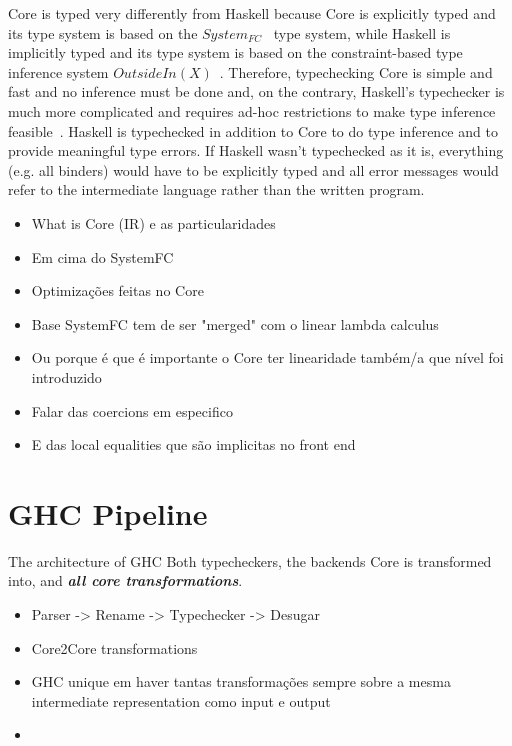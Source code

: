 \documentclass[]{lwnovathesis}
\begin{document}
Core is typed very differently from Haskell because Core is explicitly typed and
its type system is based on the $System_{FC}$~\cite{systemfc} type system, while
Haskell is implicitly typed and its type system is based on the constraint-based
type inference system $OutsideIn(X)$~\cite{outsideinx}. Therefore, typechecking
Core is simple and fast and no inference must be done and, on the contrary,
Haskell's typechecker is much more complicated and requires ad-hoc restrictions
to make type inference feasible~\cite{}.
%
Haskell is typechecked in addition to Core to do type inference and to provide
meaningful type errors. If Haskell wasn't typechecked as it is, everything (e.g.
all binders) would have to be explicitly typed and all error messages would
refer to the intermediate language rather than the written program.



\begin{itemize}
    \item What is Core (IR) e as particularidades
    \item Em cima do SystemFC
    \item Optimizações feitas no Core
    \item Base SystemFC tem de ser "merged" com o linear lambda calculus
    \item Ou porque é que é importante o Core ter linearidade também/a que nível
        foi introduzido
    \item Falar das coercions em especifico
    \item E das local equalities que são implicitas no front end
\end{itemize}

\section{GHC Pipeline}

The architecture of GHC
Both typecheckers, the backends Core is transformed into, and \textbf{\emph{all
core transformations}}.

\begin{itemize}
    \item Parser -> Rename -> Typechecker -> Desugar
    \item Core2Core transformations
    \item GHC unique em haver tantas transformações sempre sobre a mesma intermediate
        representation como input e output
    \item 
\end{itemize}
\end{document}
